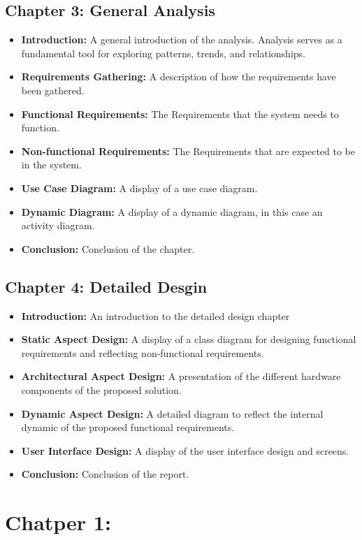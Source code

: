 \documentclass{article}
\begin{document}
\subsection{Chapter 3: General Analysis}
\begin{itemize}
    \item \textbf{Introduction:} A general introduction of the analysis. Analysis serves as a fundamental tool for exploring patterns, trends, and relationships.
    \item \textbf{Requirements Gathering:} A description of how the requirements have been gathered.
    \item \textbf{Functional Requirements:} The Requirements that the system needs to function.
    \item \textbf{Non-functional Requirements:} The Requirements that are expected to be in the system.
    \item \textbf{Use Case Diagram:} A display of a use case diagram.
    \item \textbf{Dynamic Diagram:} A display of a dynamic diagram, in this case an activity diagram.
    \item \textbf{Conclusion:} Conclusion of the chapter.
\end{itemize}
      \subsection{Chapter 4: Detailed Desgin}
\begin{itemize}
    \item \textbf{Introduction:} An introduction to the detailed design chapter
    \item \textbf{Static Aspect Design:} A display of a class diagram for designing functional requirements and reflecting non-functional requirements.
    \item \textbf{Architectural Aspect Design:} A presentation of the different hardware components of the proposed solution.
    \item \textbf{Dynamic Aspect Design:} A detailed diagram to reflect the internal dynamic of the proposed functional requirements.
    \item \textbf{User Interface Design:} A display of the user interface design and screens.
    \item \textbf{Conclusion:} Conclusion of the report.
\end{itemize}\pagebreak
\section{Chatper 1: }
\end{document}
